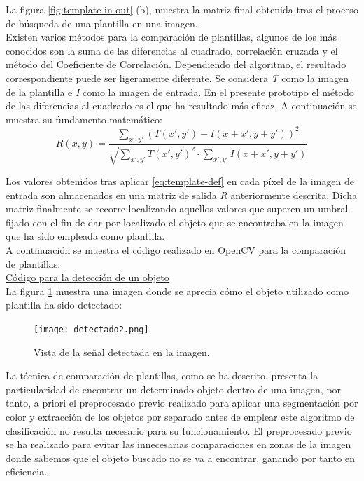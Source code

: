 La figura \ref{fig:template-in-out} (b), muestra la matriz final obtenida tras el proceso de búsqueda de una plantilla en una imagen.\\

Existen varios métodos para la comparación de plantillas, algunos de los más conocidos son la suma de las diferencias al cuadrado, correlación cruzada y el método del Coeficiente de Correlación. Dependiendo del algoritmo, el resultado correspondiente puede ser ligeramente diferente. Se considera \emph{T} como la imagen de la plantilla e \emph{I} como la imagen de entrada. En el presente prototipo el método de las diferencias al cuadrado es el que ha resultado más eficaz. A continuación se muestra su fundamento matemático:\\

\begin{equation}
  R(x,y) = \frac{\sum_{x',y'} (T(x',y') - I(x+x',y+y'))^2} {\sqrt{\sum_{x',y'}T(x',y')^2 \cdot \sum_{x',y'}I(x+x',y+y')}} 
\label{eq:template-def}
\end{equation}

Los valores obtenidos tras aplicar \ref{eq:template-def} en cada píxel de la imagen de entrada son almacenados en una matriz de salida \emph{R} anteriormente descrita. Dicha matriz finalmente se recorre localizando aquellos valores que superen un umbral fijado con el fin de dar por localizado el objeto que se encontraba en la imagen que ha sido empleada como plantilla.\\
  
A continuación se muestra el código realizado en OpenCV para la comparación de plantillas:\\

\underline{Código para la detección de un objeto}\\


La figura \ref{fig:detectado} muestra una imagen donde se aprecia cómo el objeto utilizado como plantilla ha sido detectado:\\

\begin{figure}[H]
  \begin{center}
    \texttt{[image: detectado2.png]}
  \end{center}
  \caption{Vista de la señal detectada en la imagen.}
  \label{fig:detectado}
\end{figure}

La técnica de comparación de plantillas, como se ha descrito, presenta la particularidad de encontrar un determinado objeto dentro de una imagen, por tanto, a priori el preprocesado previo realizado para aplicar una segmentación por color y extracción de los objetos por separado antes de emplear este algoritmo de clasificación no resulta necesario para su funcionamiento. El preprocesado previo se ha realizado para evitar las innecesarias comparaciones en zonas de la imagen donde sabemos que el objeto buscado no se va a encontrar, ganando por tanto en eficiencia.

